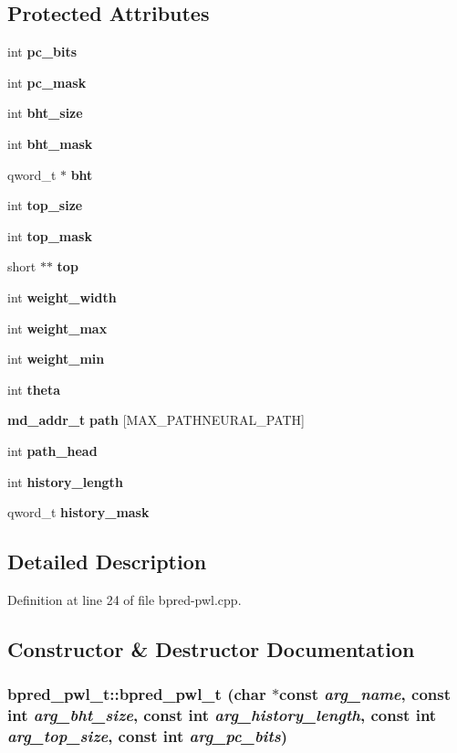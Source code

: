 \subsection*{Protected Attributes}
\begin{CompactItemize}
\item 
int {\bf pc\_\-bits}
\item 
int {\bf pc\_\-mask}
\item 
int {\bf bht\_\-size}
\item 
int {\bf bht\_\-mask}
\item 
qword\_\-t $\ast$ {\bf bht}
\item 
int {\bf top\_\-size}
\item 
int {\bf top\_\-mask}
\item 
short $\ast$$\ast$ {\bf top}
\item 
int {\bf weight\_\-width}
\item 
int {\bf weight\_\-max}
\item 
int {\bf weight\_\-min}
\item 
int {\bf theta}
\item 
{\bf md\_\-addr\_\-t} {\bf path} [MAX\_\-PATHNEURAL\_\-PATH]
\item 
int {\bf path\_\-head}
\item 
int {\bf history\_\-length}
\item 
qword\_\-t {\bf history\_\-mask}
\end{CompactItemize}


\subsection{Detailed Description}


Definition at line 24 of file bpred-pwl.cpp.

\subsection{Constructor \& Destructor Documentation}
\subsubsection[{bpred\_\-pwl\_\-t}]{\setlength{\rightskip}{0pt plus 5cm}bpred\_\-pwl\_\-t::bpred\_\-pwl\_\-t (char $\ast$const  {\em arg\_\-name}, \/  const int {\em arg\_\-bht\_\-size}, \/  const int {\em arg\_\-history\_\-length}, \/  const int {\em arg\_\-top\_\-size}, \/  const int {\em arg\_\-pc\_\-bits})\hspace{0.3cm}{\tt  [inline]}}\label{classbpred__pwl__t_169a553dbedb4e57fcc558c731463185}




